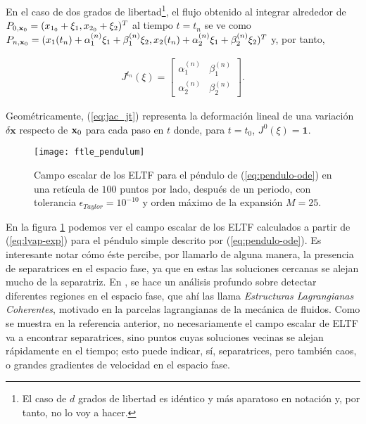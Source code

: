 En el caso de dos grados de libertad\footnote{El caso de $d$ grados de libertad es idéntico y más aparatoso en notación y, por tanto, no lo voy a hacer.}, el flujo obtenido al integrar alrededor de $P_{0,\mathbf{x}_0} = (x_{1_0} + \xi_1, x_{2_0} + \xi_2 )^T$ al tiempo $t=t_n$ se ve como $P_{n,\mathbf{x}_0} = (x_1(t_n) + \alpha_1^{(n)} \xi_1 + \beta_1^{(n)} \xi_2, x_2(t_n) + \alpha_2^{(n)} \xi_1 + \beta_2^{(n)} \xi_2)^T$ y, por tanto, 

\begin{align}
 J^{t_n}(\xi) = \left[ \begin{array}{ccc}
 \alpha_1^{(n)} & \beta_1^{(n)}  \\
 \alpha_2^{(n)} & \beta_2^{(n)}
 \end{array} \right].
 \label{eq:jac_jt}
\end{align}

Geométricamente, (\ref{eq:jac_jt}) representa la deformación lineal de una variación $\delta \mathbf{x}$ respecto de $\mathbf{x}_0$ para cada paso en $t$ donde, para $t = t_0$, $J^0(\xi) = \mathbf{1}$.


\begin{figure}[h!]
 \centering
 \texttt{[image: ftle\_pendulum]}
 \caption{Campo escalar de los ELTF para el péndulo de (\ref{eq:pendulo-ode}) en una retícula de $100$ puntos por lado, después de un periodo, con tolerancia $\epsilon_{Taylor} = 10^{-10}$ y orden máximo de la expansión $M = 25$.}
 \label{fig:ftle_pendulum}
\end{figure}

En la figura \ref{fig:ftle_pendulum} podemos ver el campo escalar de los ELTF calculados a partir de (\ref{eq:lyap-exp}) para el péndulo simple descrito por (\ref{eq:pendulo-ode}). Es interesante notar cómo éste percibe, por llamarlo de alguna manera, la presencia de separatrices en el espacio fase, ya que en estas las soluciones cercanas se alejan mucho de la separatriz. En \cite{Haller2011}, se hace un análisis profundo sobre detectar diferentes regiones en el espacio fase, que ahí las llama \textit{Estructuras Lagrangianas Coherentes}, motivado en la parcelas lagrangianas de la mecánica de fluidos. Como se muestra en la referencia anterior, no necesariamente el campo escalar de ELTF va a encontrar separatrices, sino puntos cuyas soluciones vecinas se alejan rápidamente en el tiempo; esto puede indicar, sí, separatrices, pero también caos, o grandes gradientes de velocidad en el espacio fase.

